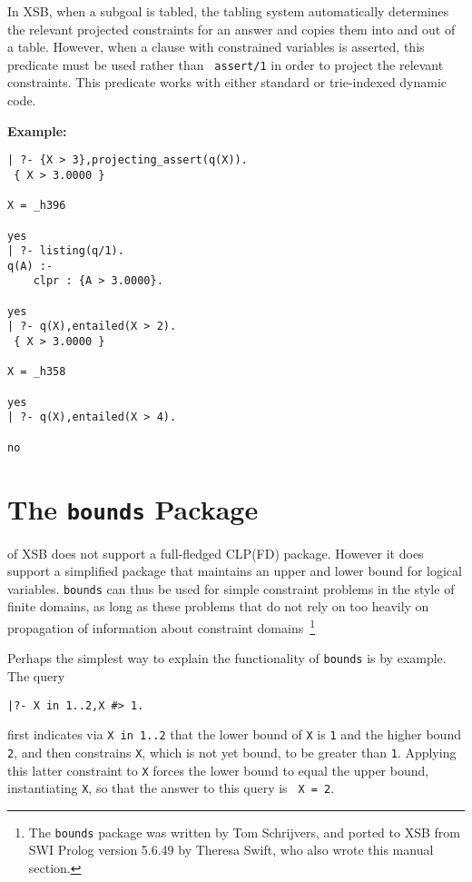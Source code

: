 \begin{description}

%
In XSB, when a subgoal is tabled, the tabling system automatically
determines the relevant projected constraints for an answer and copies
them into and out of a table.  However, when a clause with constrained
variables is asserted, this predicate must be used rather than {\tt
  assert/1} in order to project the relevant constraints.  This
predicate works with either standard or trie-indexed dynamic code.

{\bf Example:}
{\small
\begin{verbatim}
| ?- {X > 3},projecting_assert(q(X)).
 { X > 3.0000 }

X = _h396

yes
| ?- listing(q/1).
q(A) :-
    clpr : {A > 3.0000}.

yes
| ?- q(X),entailed(X > 2).
 { X > 3.0000 }

X = _h358

yes
| ?- q(X),entailed(X > 4).

no
\end{verbatim}
}
\end{description}

\section{The {\tt bounds} Package} \label{sec:bounds}
%

\version{} of XSB does not support a full-fledged CLP(FD) package.
However it does support a simplified package that maintains an upper
and lower bound for logical variables.  {\tt bounds} can thus be used
for simple constraint problems in the style of finite domains, as long
as these problems that do not rely on too heavily on propagation of
information about constraint domains~\footnote{The {\tt bounds}
  package was written by Tom Schrijvers, and ported to XSB from SWI
  Prolog version 5.6.49 by Theresa Swift, who also wrote this manual
  section.}

Perhaps the simplest way to explain the functionality of {\tt bounds}
is by example.  The query
%
{\small
\begin{verbatim}
|?- X in 1..2,X #> 1.
\end{verbatim}
}
%
\noindent
first indicates via {\tt X in 1..2} that the lower bound of {\tt X} is
{\tt 1} and the higher bound {\tt 2}, and then constrains {\tt X},
which is not yet bound, to be greater than {\tt 1}.  Applying this
latter constraint to {\tt X} forces the lower bound to equal the upper
bound, instantiating {\tt X}, so that the answer to this query is {\tt
  X = 2}.

